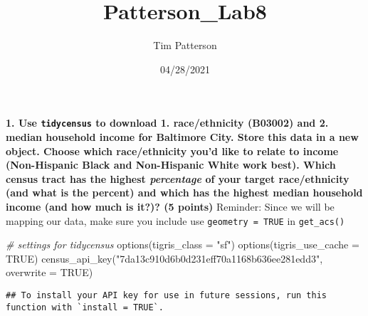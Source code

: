 \documentclass[
]{article}
\title{Patterson\_Lab8}
\author{Tim Patterson}
\date{04/28/2021}
\newenvironment{Shaded}{\begin{snugshade}}{\end{snugshade}}
\newcommand{\AttributeTok}[1]{\textcolor[rgb]{0.77,0.63,0.00}{#1}}
\newcommand{\CommentTok}[1]{\textcolor[rgb]{0.56,0.35,0.01}{\textit{#1}}}
\newcommand{\ConstantTok}[1]{\textcolor[rgb]{0.00,0.00,0.00}{#1}}
\newcommand{\FunctionTok}[1]{\textcolor[rgb]{0.00,0.00,0.00}{#1}}
\newcommand{\NormalTok}[1]{#1}
\newcommand{\StringTok}[1]{\textcolor[rgb]{0.31,0.60,0.02}{#1}}
\begin{document}
\maketitle

\textbf{1. Use \texttt{tidycensus} to download 1. race/ethnicity
(B03002) and 2. median household income for Baltimore City. Store this
data in a new object. Choose which race/ethnicity you'd like to relate
to income (Non-Hispanic Black and Non-Hispanic White work best). Which
census tract has the highest \emph{percentage} of your target
race/ethnicity (and what is the percent) and which has the highest
median household income (and how much is it?)? (5 points)} Reminder:
Since we will be mapping our data, make sure you include use
\texttt{geometry\ =\ TRUE} in \texttt{get\_acs()}

\begin{Shaded}
\begin{Highlighting}[]
\CommentTok{\# settings for tidycensus}
\FunctionTok{options}\NormalTok{(}\AttributeTok{tigris\_class =} \StringTok{"sf"}\NormalTok{)}
\FunctionTok{options}\NormalTok{(}\AttributeTok{tigris\_use\_cache =} \ConstantTok{TRUE}\NormalTok{)}
\FunctionTok{census\_api\_key}\NormalTok{(}\StringTok{"7da13c910d6b0d231eff70a1168b636ee281edd3"}\NormalTok{, }\AttributeTok{overwrite =} \ConstantTok{TRUE}\NormalTok{)}
\end{Highlighting}
\end{Shaded}

\begin{verbatim}
## To install your API key for use in future sessions, run this function with `install = TRUE`.
\end{verbatim}
\end{document}
